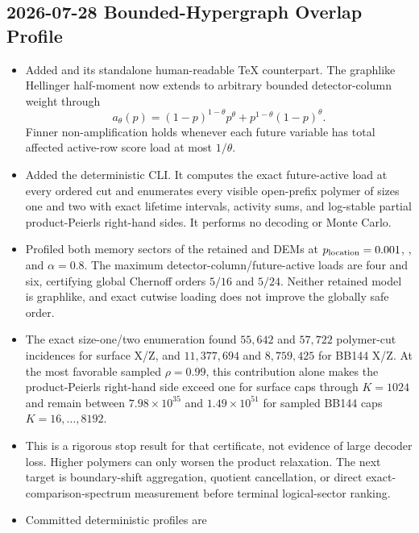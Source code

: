 \subsection*{2026-07-28 Bounded-Hypergraph Overlap Profile}

\begin{itemize}
\item Added
\texttt{} and its standalone
human-readable TeX counterpart.  The graphlike Hellinger half-moment now
extends to arbitrary bounded detector-column weight through
\[
 a_\theta(p)
 =
 (1-p)^{1-\theta}p^\theta+
 p^{1-\theta}(1-p)^\theta.
\]
Finner non-amplification holds whenever each future variable has total
affected active-row score load at most \(1/\theta\).
\item Added the deterministic
\texttt{} CLI.  It computes the exact
future-active load at every ordered cut and enumerates every visible
open-prefix polymer of sizes one and two with exact lifetime intervals,
activity sums, and log-stable partial product-Peierls right-hand sides.  It
performs no decoding or Monte Carlo.
\item Profiled both memory sectors of the retained
\texttt{} and
\texttt{} DEMs at
\(p_{\rm location}=0.001\), \texttt{}, and
\(\alpha=0.8\).  The maximum detector-column/future-active loads are four
and six, certifying global Chernoff orders \(5/16\) and \(5/24\).
Neither retained model is graphlike, and exact cutwise loading does not
improve the globally safe order.
\item The exact size-one/two enumeration found \(55{,}642\) and \(57{,}722\)
polymer-cut incidences for surface X/Z, and \(11{,}377{,}694\) and
\(8{,}759{,}425\) for BB144 X/Z.  At the most favorable sampled
\(\rho=0.99\), this contribution alone makes the product-Peierls right-hand
side exceed one for surface caps through \(K=1024\) and remain between
\(7.98\times10^{35}\) and \(1.49\times10^{51}\) for sampled BB144 caps
\(K=16,\ldots,8192\).
\item This is a rigorous stop result for that certificate, not evidence of
large decoder loss.  Higher polymers can only worsen the product relaxation.
The next target is boundary-shift aggregation, quotient cancellation, or
direct exact-comparison-spectrum measurement before terminal logical-sector
ranking.
\item Committed deterministic profiles are
\texttt{}

\end{itemize}
